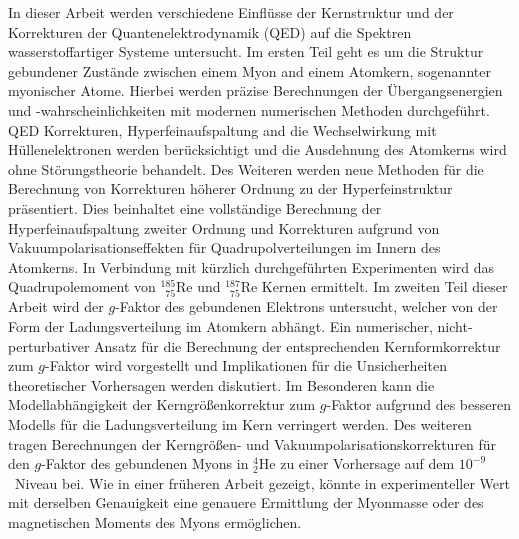 
{\small{}
In dieser Arbeit werden verschiedene Einflüsse der Kernstruktur und der Korrekturen der Quantenelektrodynamik (QED) auf die Spektren wasserstoffartiger Systeme untersucht.
Im ersten Teil geht es um die Struktur gebundener Zustände zwischen einem Myon and einem Atomkern, sogenannter myonischer Atome.
Hierbei werden präzise Berechnungen der Übergangsenergien und \mbox{-wahrscheinlichkeiten} mit modernen numerischen Methoden durchgeführt. QED Korrekturen, Hyperfeinaufspaltung and die Wechselwirkung mit Hüllenelektronen werden berücksichtigt und die Ausdehnung des Atomkerns wird ohne Störungstheorie behandelt. Des Weiteren werden neue Methoden für die Berechnung von Korrekturen höherer Ordnung zu der Hyperfeinstruktur präsentiert. Dies beinhaltet eine vollständige Berechnung der Hyperfeinaufspaltung zweiter Ordnung und Korrekturen aufgrund von Vakuumpolarisationseffekten für Quadrupolverteilungen im Innern des Atomkerns. 
In Verbindung mit kürzlich durchgeführten Experimenten wird das Quadrupolemoment von $^{185}_{\phantom{1}75}$Re und $^{187}_{\phantom{1}75}$Re Kernen ermittelt.
Im zweiten Teil dieser Arbeit wird der $g$-Faktor des gebundenen Elektrons untersucht, welcher von der Form der Ladungsverteilung im Atomkern abhängt. Ein numerischer, nicht-perturbativer Ansatz für die Berechnung der entsprechenden Kernformkorrektur zum $g$-Faktor wird vorgestellt und Implikationen für die Unsicherheiten theoretischer Vorhersagen werden diskutiert. Im Besonderen kann die Modellabhängigkeit der Kerngrößenkorrektur zum $g$-Faktor aufgrund des besseren Modells für die Ladungsverteilung im Kern verringert werden.
Des weiteren tragen Berechnungen der Kerngrößen- und Vakuumpolarisationskorrekturen für den $g$-Faktor des gebundenen Myons in $^{4}_2$He zu einer Vorhersage auf dem $10^{-9}$~Niveau bei. Wie in einer früheren Arbeit gezeigt, könnte in experimenteller Wert mit derselben Genauigkeit eine genauere Ermittlung der Myonmasse oder des magnetischen Moments des Myons ermöglichen.
}
